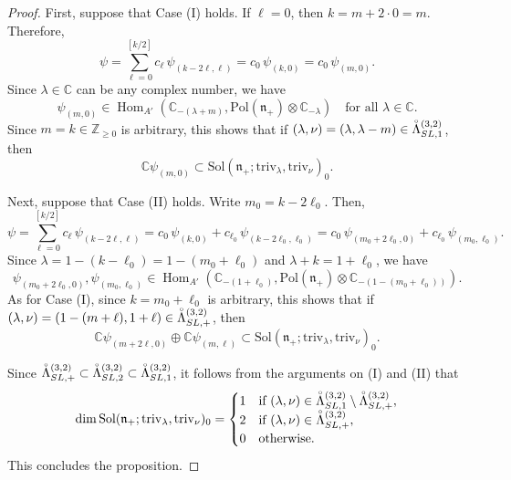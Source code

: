 \documentclass[reqno,11pt]{amsart}
\theoremstyle{remark}
\theoremstyle{definition}
\numberwithin{equation}{section}
\newcommand{\gL}{\Lambda}
\newcommand{\fn}{{\mathfrak n}}
\newcommand{\C}{\mathbb{C}}
\newcommand{\Z}{\mathbb{Z}}
\newcommand{\Hom}{\operatorname{Hom}}
\newcommand{\Sol}{\mathrm{Sol}}
\newcommand{\Pol}{\mathrm{Pol}}
\newcommand{\triv}{\mathrm{triv}}
\begin{document}
\begin{proof}
First, suppose that Case (I) holds. 
If $\ell=0$, then $k=m+2\cdot 0 = m$. Therefore, 
\begin{equation*}
\psi = 
\sum_{\ell =0}^{[k/2]}
 c_\ell \, \psi_{(k-2\ell, \ell)}
=c_0\, \psi_{(k,0)}
=c_0\, \psi_{(m,0)}.
\end{equation*}
Since $\lambda \in \C$ can be any complex number,  we have
\begin{equation*}
\psi_{(m,0)}  \in 
\Hom_{A'}(\C_{-(\lambda+m)}, \Pol(\fn_+)\otimes \C_{-\lambda})
\quad
\text{for all $\lambda \in \C$}.
\end{equation*}
Since $m=k \in \Z_{\geq 0}$ is arbitrary, this shows that
if $(\lambda,\nu)=(\lambda,\lambda-m) \in \accentset{\circ}{\gL}^{(3,2)}_{SL,1}$, then
\begin{equation*}
\C\psi_{(m,0)} \subset \Sol(\fn_+; \triv_{\lambda}, \triv_{\nu})_0.
\end{equation*}

Next, suppose that Case (II) holds.
Write $m_0=k-2\ell_0$. Then,
\begin{equation*}
\psi = 
\sum_{\ell =0}^{[k/2]}
c_\ell\, \psi_{(k-2\ell, \ell)}
=c_0\, \psi_{(k,0)} + c_{\ell_0}\, \psi_{(k-2\ell_0,\ell_0)}
=c_0\, \psi_{(m_0+2\ell_0,0)} + c_{\ell_0}\, \psi_{(m_0,\ell_0)}.
\end{equation*}
Since $\lambda = 1-(k-\ell_0)=1-(m_0+\ell_0)$ and $\lambda+k = 1+\ell_0$,
we have
\begin{equation*}
\psi_{(m_0+2\ell_0,0)}, \psi_{(m_0,\ell_0)} \in 
\Hom_{A'}(\C_{-(1+\ell_0)}, \Pol(\fn_+)\otimes \C_{-(1-(m_0+\ell_0))}).
\end{equation*}
As for Case (I), since $k = m_0 + \ell_0$ is arbitrary, this shows that
if $(\lambda,\nu)=(1-(m+\ell), 1+\ell) \in \accentset{\circ}{\gL}^{(3,2)}_{SL,+}$,
then 
\begin{equation*}
\C\psi_{(m+2\ell,0)} \oplus \C \psi_{(m,\ell)} \subset
\Sol(\fn_+; \triv_{\lambda}, \triv_{\nu})_0.
\end{equation*}

Since
$\accentset{\circ}{\gL}^{(3,2)}_{SL,+} \subset 
\accentset{\circ}{\gL}^{(3,2)}_{SL,2} \subset
\accentset{\circ}{\gL}^{(3,2)}_{SL,1}$,
it follows from the arguments on (I) and (II) that
\begin{equation*}
\dim \Sol(\fn_+; \triv_{\lambda}, \triv_{\nu})_0=
\begin{cases}
1 & \text{if $(\lambda,\nu) \in 
\accentset{\circ}{\gL}^{(3,2)}_{SL,1}
\setminus \accentset{\circ}{\gL}^{(3,2)}_{SL,+}$},\\
2& \text{if $(\lambda,\nu) \in \accentset{\circ}{\gL}^{(3,2)}_{SL,+}$},\\
0 & \text{otherwise}.
\end{cases}
\end{equation*}
This concludes the proposition.
\end{proof}
\end{document}
